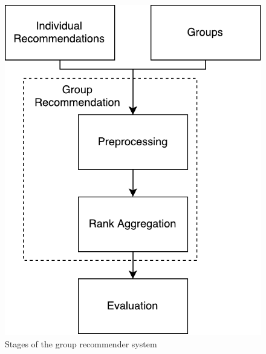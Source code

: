 \begin{figure}[t!]
\centering
\includegraphics[scale=.4]{graphics/composition}
\caption{Stages of the group recommender system}\label{fig:composition}
\end{figure}